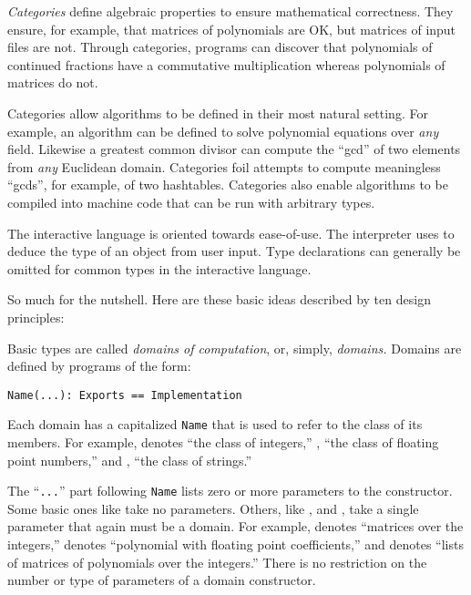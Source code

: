 {\it Categories} define
algebraic properties to ensure mathematical
correctness. They ensure, for example,
that matrices of polynomials are OK, but
matrices of input files are not.
Through categories, programs can
discover that polynomials of continued fractions
have a commutative
multiplication whereas polynomials of matrices do not.

Categories allow algorithms to be defined in their most natural
setting. For example,
an algorithm can be defined to solve polynomial
equations over {\it any} field.
Likewise a greatest common divisor
can compute the ``gcd'' of two elements
from {\it any} Euclidean domain.
Categories foil
attempts to compute meaningless ``gcds'', for example, of two hashtables.
Categories also enable
algorithms to be compiled into machine code that can be run with
arbitrary types.

The \Language{} interactive language is oriented towards
ease-of-use.
The \Language{} interpreter uses
 to deduce the
type of an object from user input.
Type declarations can generally be omitted for common types in the
interactive language.

So much for the nutshell.
Here are these basic ideas described by ten design principles:

%

\par %
Basic types are called {\it domains of computation}, or,
simply, {\it domains.}
Domains are defined by \Language{} programs of the form:

\begin{verbatim}
Name(...): Exports == Implementation
\end{verbatim}
Each domain has a capitalized {\tt Name} that is
used to refer to the class of its
members.
For example,  denotes ``the class of integers,''
, ``the class of floating point numbers,'' and
, ``the class of strings.''

The ``{\tt ...}'' part following {\tt Name} lists zero or more parameters
to the constructor.
Some basic ones like 
take no parameters.
Others, like ,  and
, take a single parameter that again must be a domain.
For example,  denotes ``matrices over the
integers,''  denotes ``polynomial with
floating point coefficients,'' and
 denotes ``lists of matrices
of polynomials over the integers.''
There is no restriction on the number or type of
parameters of a domain constructor.

